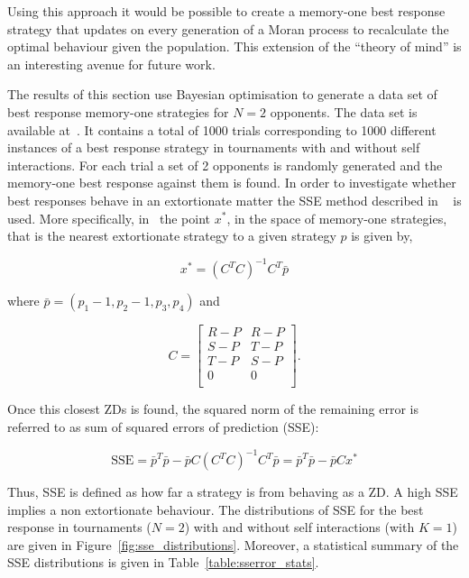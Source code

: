 \documentclass[10pt]{article}
\begin{document}
Using this approach it would be possible to create a memory-one best response
strategy that updates on every generation of a Moran process to recalculate the
optimal behaviour given the population. This extension of the ``theory of mind''
is an interesting avenue for future work.

The results of this section use Bayesian optimisation to generate a data set of best response
memory-one strategies for \(N=2\) opponents.
The data set is available at~\cite{glynatsi2019}. It contains a total of 1000 trials
corresponding to 1000 different instances of a best response strategy in
tournaments with and without self interactions. For each trial a set of 2 opponents is
randomly generated and the memory-one best response against them is found.
In order to investigate whether best responses
behave in an extortionate matter the SSE method described in ~\cite{Knight2019} is used. More
specifically,
in~\cite{Knight2019} the point \(x^*\), in the space of memory-one strategies,
that is
the nearest extortionate strategy to a given strategy \(p\) is
given by,

\begin{equation}\label{eqn:x_star_formula}
    x^* = {\left(C^{T}C\right)}^{-1}C^{T}\bar{p}
\end{equation}

where \(\bar{p}=(p_1 - 1, p_2 - 1, p_3, p_4)\) and

\begin{equation}\label{eq:definition_of_C}
    C =
    \begin{bmatrix}
        R - P & R- P \\
        S - P & T- P \\
        T - P & S- P \\
        0     & 0 \\
    \end{bmatrix}.
\end{equation}

Once this closest ZDs is found, the squared norm of the remaining error is referred to as sum of squared errors
of prediction (SSE):

\begin{equation}\label{eqn:x_SSError_formula}
    \text{SSE} = {\bar{p}} ^ T \bar{p} -
           \bar{p} C \left(C ^ T C \right) ^ {-1} C ^ T \bar{p}
         = {\bar{p}} ^ T \bar{p} - \bar{p} C x ^ *
\end{equation}

Thus, SSE is defined as how far a strategy is from behaving as a ZD. A
high SSE implies a non extortionate behaviour.
The distributions of SSE for the best response in tournaments
(\(N=2\)) with and without self interactions (with \(K=1\)) are given in
Figure~\ref{fig:sse_distributions}. Moreover, a statistical summary of the SSE
distributions is given in Table~\ref{table:sserror_stats}.
\end{document}
